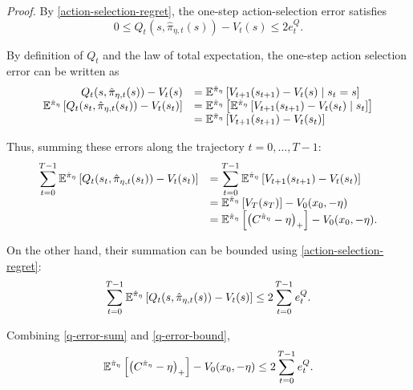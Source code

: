 \textit{Proof.}
By \eqref{action-selection-regret}, the one-step action-selection error satisfies
\begin{equation*}
	0 \leq Q_t(s, \hat{\pi}_{\eta, t}(s)) - V_t(s) \leq 2e_t^Q.
\end{equation*}

By definition of $Q_t$ and the law of total expectation, the one-step action selection error can be written as
\begin{equation}
	\begin{array}{rl}
		Q_t(s, \hat{\pi}_{\eta, t}(s)) - V_t(s) &= \mathbb{E}^{\hat{\pi}_{\eta}} \left[ V_{t+1}(s_{t+1}) - V_t(s) \mid s_t = s \right] \\
		\mathbb{E}^{\hat{\pi}_{\eta}} \left[ Q_t(s_t, \hat{\pi}_{\eta, t}(s_t)) - V_t(s_t) \right] &= \mathbb{E}^{\hat{\pi}_{\eta}} \left[ \mathbb{E}^{\hat{\pi}_{\eta}} \left[ V_{t+1}(s_{t+1}) - V_t(s_t) \mid s_t \right] \right] \\
		&= \mathbb{E}^{\hat{\pi}_{\eta}} \left[ V_{t+1}(s_{t+1}) - V_t(s_t) \right]
	\end{array}
	\notag
	\label{q-error-as-value-difference}
\end{equation}

Thus, summing these errors along the trajectory $t=0, \dots , T-1$:
\begin{equation}
	\begin{array}{rl}
		\displaystyle \sum_{t=0}^{T-1} \mathbb{E}^{\hat{\pi}_{\eta}} \left[ Q_t(s_t, \hat{\pi}_{\eta, t}(s_t)) - V_t(s_t) \right] & \displaystyle = \sum_{t=0}^{T-1} \mathbb{E}^{\hat{\pi}_{\eta}} \left[ V_{t+1}(s_{t+1}) - V_t(s_t) \right] \\
		& \displaystyle = \mathbb{E}^{\hat{\pi}_{\eta}} \left[ V_T(s_T) \right] - V_0(x_0, -\eta) \\
		& = \mathbb{E}^{\hat{\pi}_{\eta}} \left[ \left( C^{\hat{\pi}_{\eta}} - \eta \right)_+ \right] - V_0(x_0, -\eta).
	\end{array}
	\label{q-error-sum}
\end{equation}

On the other hand, their summation can be bounded using \eqref{action-selection-regret}:
\begin{equation}
	\sum_{t=0}^{T-1} \mathbb{E}^{\hat{\pi}_{\eta}} \left[ Q_t(s, \hat{\pi}_{\eta, t}(s)) - V_t(s) \right] \leq 2\sum_{t=0}^{T-1} e_t^Q.
	\label{q-error-bound}
\end{equation}

Combining \eqref{q-error-sum} and \eqref{q-error-bound},
\begin{equation*}
	\mathbb{E}^{\hat{\pi}_{\eta}} \left[ \left( C^{\hat{\pi}_{\eta}} - \eta \right)_+ \right] - V_0(x_0, -\eta) \leq 2\sum_{t=0}^{T-1} e_t^Q.
\end{equation*}

